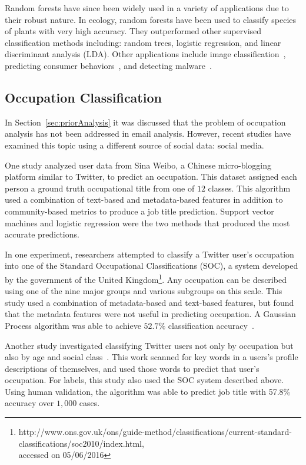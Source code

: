 \documentclass[12pt]{report}
\begin{document}
Random forests have since been widely used in a variety of applications due to their robust nature.
In ecology, random forests have been used to classify species of plants with very high accuracy.
They outperformed other supervised classification methods including: random trees, logistic regression, and linear discriminant analysis (LDA)\cite{cutler2007random}.
Other applications include image classification~\cite{marin2013random}, predicting consumer behaviors~\cite{lariviere2005predicting}, and detecting malware~\cite{sami2010malware}. 

\subsection{Occupation Classification}
In Section~\ref{sec:priorAnalysis} it was discussed that the problem of occupation analysis has not been addressed in email analysis.
However, recent studies have examined this topic using a different source of social data: social media.

One study analyzed user data from Sina Weibo, a Chinese  micro-blogging platform similar to Twitter, to predict an occupation\cite{huang2015multi}.
This dataset assigned each person a ground truth occupational title from one of $12$ classes.
This algorithm used a combination of text-based and metadata-based features in addition to community-based metrics to produce a job title prediction.
Support vector machines and logistic regression were the two methods that produced the most accurate predictions.  

In one experiment, researchers attempted to classify a Twitter user's occupation into one of the Standard Occupational Classifications (SOC), a system developed by the government of the United Kingdom\footnote{http://www.ons.gov.uk/ons/guide-method/classifications/current-standard-classifications/soc2010/index.html, \\ accessed on 05/06/2016}.
Any occupation can be described using one of the nine major groups and various subgroups on this scale.
This study used a combination of metadata-based and text-based features, but found that the metadata features were not useful in predicting occupation.
A Gaussian Process algorithm was able to achieve $52.7\%$ classification accuracy~\cite{preoctiuc2015analysis}.

Another study investigated classifying Twitter users not only by occupation but also by age and social class~\cite{sloan2015tweets}.
This work scanned for key words in a users's profile descriptions of themselves, and used those words to predict that user's occupation. 
For labels, this study also used the SOC system described above.
Using human validation, the algorithm was able to predict job title with 57.8\% accuracy over $1,000$ cases.
\end{document}
